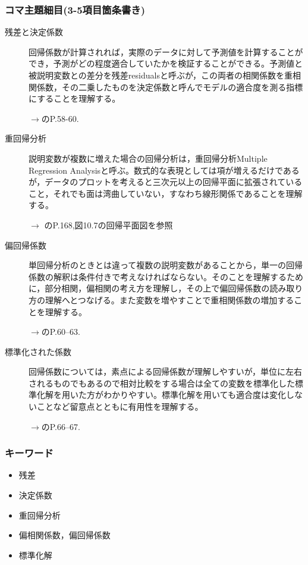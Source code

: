 \subsubsection{コマ主題細目(3-5項目箇条書き)}
\begin{description}
\item[残差と決定係数]回帰係数が計算されれば，実際のデータに対して予測値を計算することができ，予測がどの程度適合していたかを検証することができる。予測値と被説明変数との差分を残差residualsと呼ぶが，この両者の相関係数を重相関係数，その二乗したものを決定係数と呼んでモデルの適合度を測る指標にすることを理解する。
\begin{flushright}
    $\to$\citet{野島201903}のP.58-60.
\end{flushright}

\item[重回帰分析]説明変数が複数に増えた場合の回帰分析は，重回帰分析Multiple Regression Analysisと呼ぶ。数式的な表現としては項が増えるだけであるが，データのプロットを考えると三次元以上の回帰平面に拡張されていること，それでも面は湾曲していない，すなわち線形関係であることを理解する。
\begin{flushright}
    $\to$ \citet{kosugi2019}のP.168,図10.7の回帰平面図を参照
\end{flushright}

\item[偏回帰係数]単回帰分析のときとは違って複数の説明変数があることから，単一の回帰係数の解釈は条件付きで考えなければならない。そのことを理解するために，部分相関，偏相関の考え方を理解し，その上で偏回帰係数の読み取り方の理解へとつなげる。また変数を増やすことで重相関係数の増加することを理解する。
\begin{flushright}
    $\to$\citet{kosugi2018}のP.60--63.
\end{flushright}

\item[標準化された係数]回帰係数については，素点による回帰係数が理解しやすいが，単位に左右されるものでもあるので相対比較をする場合は全ての変数を標準化した標準化解を用いた方がわかりやすい。標準化解を用いても適合度は変化しないことなど留意点とともに有用性を理解する。
\begin{flushright}
    $\to$\citet{kosugi2018}のP.66--67.
\end{flushright}


\end{description}
\subsubsection{キーワード}
\begin{itemize}
\item 残差
\item 決定係数
\item 重回帰分析
\item 偏相関係数，偏回帰係数
\item 標準化解
\end{itemize}
